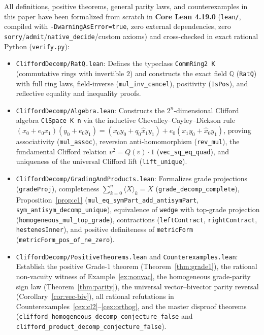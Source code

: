 \documentclass[11pt]{article}
\theoremstyle{plain}
\theoremstyle{definition}
\theoremstyle{remark}
\newcommand{\grade}[2]{\langle #1 \rangle_{#2}}
\begin{document}
All definitions, positive theorems, general parity laws, and counterexamples in this paper have been formalized from scratch in \textbf{Core Lean 4.19.0} (\texttt{lean/}, compiled with \texttt{-DwarningAsError=true}, zero external dependencies, zero \texttt{sorry}/\texttt{admit}/\texttt{native\_decide}/custom axioms) and cross-checked in exact rational Python (\texttt{verify.py}):
\begin{itemize}
  \item \texttt{CliffordDecomp/\allowbreak RatQ.lean}: Defines the typeclass \texttt{CommRing2 K} (commutative rings with invertible $2$) and constructs the exact field $\mathbb{Q}$ (\texttt{RatQ}) with full ring laws, field-inverse (\texttt{mul\_\allowbreak inv\_\allowbreak cancel}), positivity (\texttt{IsPos}), and reflective equality and inequality proofs.
  \item \texttt{CliffordDecomp/\allowbreak Algebra.lean}: Constructs the $2^n$-dimensional Clifford algebra \texttt{ClSpace K n} via the inductive Chevalley--Cayley--Dickson rule $(x_0 + e_0 x_1)(y_0 + e_0 y_1) = (x_0 y_0 + q_0 \widehat{x}_1 y_1) + e_0(x_1 y_0 + \widehat{x}_0 y_1)$, proving associativity (\texttt{mul\_\allowbreak assoc}), reversion anti-homomorphism (\texttt{rev\_\allowbreak mul}), the fundamental Clifford relation $v^2 = Q(v)\cdot 1$ (\texttt{vec\_\allowbreak sq\_\allowbreak eq\_\allowbreak quad}), and uniqueness of the universal Clifford lift (\texttt{lift\_\allowbreak unique}).
  \item \texttt{CliffordDecomp/\allowbreak GradingAndProducts.lean}: Formalizes grade projections (\texttt{gradeProj}), completeness $\sum_{k=0}^n \grade{X}{k} = X$ (\texttt{grade\_\allowbreak decomp\_\allowbreak complete}), Proposition~\ref{prop:c1} (\texttt{mul\_\allowbreak eq\_\allowbreak symPart\_\allowbreak add\_\allowbreak antisymPart}, \texttt{sym\_\allowbreak antisym\_\allowbreak decomp\_\allowbreak unique}), equivalence of \texttt{wedge} with top-grade projection (\texttt{homogeneous\_\allowbreak mul\_\allowbreak top\_\allowbreak grade}), contractions (\texttt{leftContract}, \texttt{rightContract}, \texttt{hestenesInner}), and positive definiteness of \texttt{metricForm} (\texttt{metricForm\_\allowbreak pos\_\allowbreak of\_\allowbreak ne\_\allowbreak zero}).
  \item \texttt{CliffordDecomp/\allowbreak PositiveTheorems.lean} and \texttt{Counterexamples.lean}: Establish the positive Grade-$1$ theorem (Theorem~\ref{thm:grade1}), the rational non-vacuity witness of Example~\ref{ex:nonvac}, the homogeneous grade-parity sign law (Theorem~\ref{thm:parity}), the universal vector--bivector parity reversal (Corollary~\ref{cor:vec-biv}), all rational refutations in Counterexamples~\ref{cex:cl2}--\ref{cex:orthog}, and the master disproof theorems (\texttt{clifford\_\allowbreak homogeneous\_\allowbreak decomp\_\allowbreak conjecture\_\allowbreak false} and \texttt{clifford\_\allowbreak product\_\allowbreak decomp\_\allowbreak conjecture\_\allowbreak false}).
\end{itemize}
\end{document}

